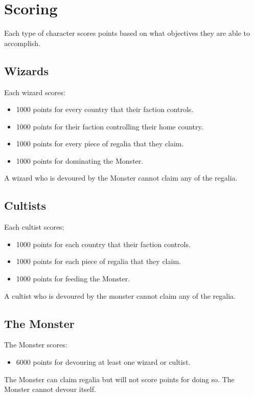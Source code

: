 \documentclass[10pt, parskip=half-, twoside]{scrartcl}
\begin{document}
\newpage

\section*{Scoring}
Each type of character scores points based on what objectives they are able to accomplish.

\subsection*{Wizards}
Each wizard scores:
\begin{itemize}
\item 1000 points for every country that their faction controls.
\item 1000 points for their faction controlling their home country.
\item 1000 points for every piece of regalia that they claim.
\item 1000 points for dominating the Monster.
\end{itemize}
A wizard who is devoured by the Monster cannot claim any of the regalia.

\newpage

\subsection*{Cultists}
Each cultist scores:
\begin{itemize}
\item 1000 points for each country that their faction controls.
\item 1000 points for each piece of regalia that they claim.
\item 1000 points for feeding the Monster.
\end{itemize}
A cultist who is devoured by the monster cannot claim any of the regalia.

\subsection*{The Monster}
The Monster scores:
\begin{itemize}
\item 6000 points for devouring at least one wizard or cultist.
\end{itemize}
The Monster can claim regalia but will not score points for doing so. The Monster cannot devour itself.
\end{document}
